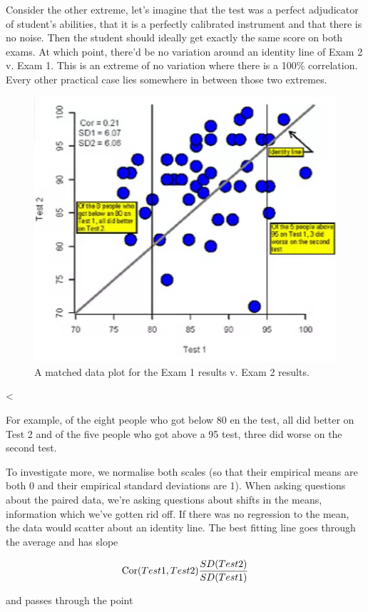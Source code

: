 \documentclass{homework}
\begin{document}
Consider the other extreme, let's imagine that the test was a perfect adjudicator of student's abilities, that it is a perfectly calibrated instrument and that there is no noise. Then the student should ideally get exactly the same score on both exams. At which point, there'd be no variation around an identity line of Exam 2 v. Exam 1. This is an extreme of no variation where there is a 100\% correlation. Every other practical case lies somewhere in between those two extremes. 
\begin{figure}
    \centering
    \includegraphics[scale = 0.4]{figs/Matched data plot.png}
    \caption{A matched data plot for the Exam 1 results v. Exam 2 results.}
    \label{fig: Matched data plot}
\end{figure}<

For example, of the eight people who got below 80 en the test, all did better on Test 2 and of the five people who got above a 95 test, three did worse on the second test. 

To investigate more, we normalise both scales (so that their empirical means are both 0 and their empirical standard deviations are 1). When asking questions about the paired data, we're asking questions about shifts in the means, information which we've gotten rid off. If there was no regression to the mean, the data would scatter about an identity line. The best fitting line goes through the average and has slope 

$$
\textnormal{Cor}(Test1, Test2) \frac{SD(Test2)}{SD(Test1)}
$$

and passes through the point 
\end{document}
